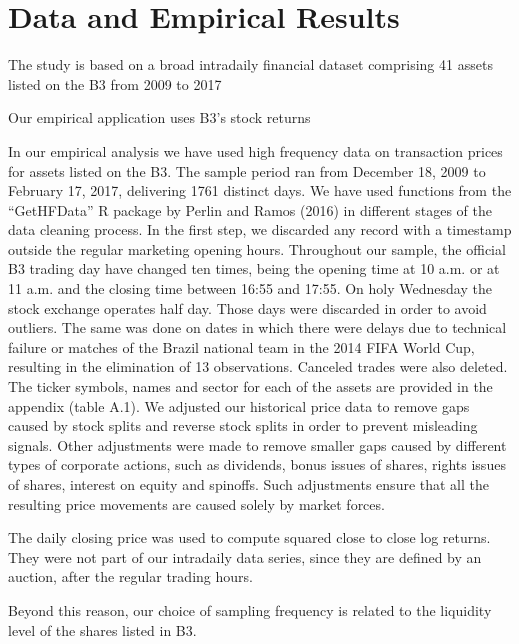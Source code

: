 	\section{Data and Empirical Results}
	
	The study is based on a	broad intradaily financial dataset comprising 41 assets listed on the B3 from 2009 to 2017
	
	Our empirical application uses B3's stock returns
	
	In our empirical analysis we have used high frequency data on transaction prices for assets listed on the B3. The sample period ran from December 18, 2009 to February 17, 2017, delivering 1761 distinct days. We have used functions from the “GetHFData” R package by Perlin and Ramos (2016) in different stages of the data cleaning process. In the first step, we discarded any record with a timestamp outside the regular marketing opening hours. Throughout our sample, the official B3 trading day have changed ten times, being the opening time at 10 a.m. or at 11 a.m. and the closing time between 16:55 and 17:55. On holy Wednesday the stock exchange operates half day. Those days were discarded in order to avoid outliers. The same was done on dates in which there were
	delays due to technical failure or matches of the Brazil national team in the 2014 FIFA World Cup, resulting in the elimination of 13 observations. Canceled trades were also deleted. The ticker symbols, names and sector for each of the assets are provided in the appendix (table A.1).
	We adjusted our historical price data to remove gaps caused by stock splits and reverse stock splits in order to prevent misleading signals. Other adjustments were made to remove smaller	gaps caused by different types of corporate actions, such as dividends, bonus issues of shares, rights issues of shares, interest on equity and spinoffs. Such adjustments ensure that all the resulting price movements are caused solely by market forces.
	
	The daily closing price was used to compute squared close to close log returns. They were not part of our intradaily data series, since they are defined by
	an auction, after the regular trading hours.
	
	Beyond this	reason, our choice of sampling frequency is related to the liquidity level of the shares listed in B3.
	
	
